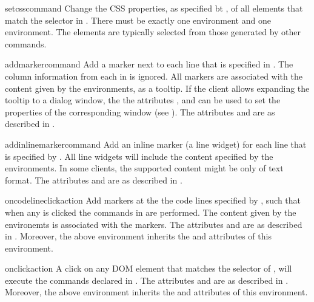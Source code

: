 \bigskip
\xmlstruct
{setcsscommand}
{
%
  Change the CSS properties, as specified bt
  , of all elements that match the
  selector in .
%
  There must be exactly one  environment and
  one  environment. 
%
  The elements are typically selected from those generated by other
  commands.
%
}
{}

\bigskip
\xmlstruct
{addmarkercommand}
{
%
  Add a marker next to each line that is specified in
  . The column information from each
   in  is ignored.  All markers
  are associated with the content given by the 
  environments, as a tooltip. If the client allows expanding the
  tooltip to a dialog window, the the attributes
  ,  and
   can be used to set the properties of the
  corresponding window (see ).
%
  The attributes  and  are
  as described in .
%
}
{}

\bigskip
\xmlstruct
{addinlinemarkercommand}
{
%
  Add an inline marker (a line widget) for each line that is specified
  by . All line widgets will include the content
  specified by the  environments. In some
  clients, the supported content might be only of text format.
%
  The attributes  and  are
  as described in .
%
}
{}

\bigskip
\xmlstruct
{oncodelineclickaction}
{
%
  Add markers at the the code lines specified by ,
  such that when any is clicked the commands in
   are performed.
  The content given by the  environemts is
  associated with the markers.
%
  The attributes  and  are
  as described in . Moreover, the above
   environment inherits the
   and  attributes of this
  environment.
%
}
{}

\bigskip
\xmlstruct
{onclickaction}
{
%
  A click on any DOM element that matches the selector of
  , will execute the commands declared in
  .
%
  The attributes  and  are
  as described in . Moreover, the above
   environment inherits the
   and  attributes of this
  environment.
%
}
{}


